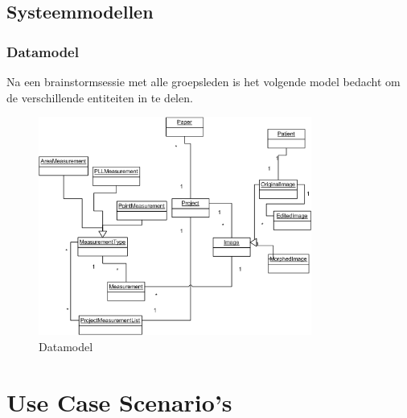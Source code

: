 \subsection{Systeemmodellen}
\subsubsection{Datamodel}
Na een brainstormsessie met alle groepsleden is het volgende model bedacht om de verschillende entiteiten in te delen.
\begin{figure}[htp]
\begin{center}
	\includegraphics[width=0.8\textwidth]{brainstorm_klassediagram}
\caption{Datamodel}
\label{fig:brainstorm_klassediagram}
\end{center}
\end{figure}

\newpage
\section{Use Case Scenario's}

